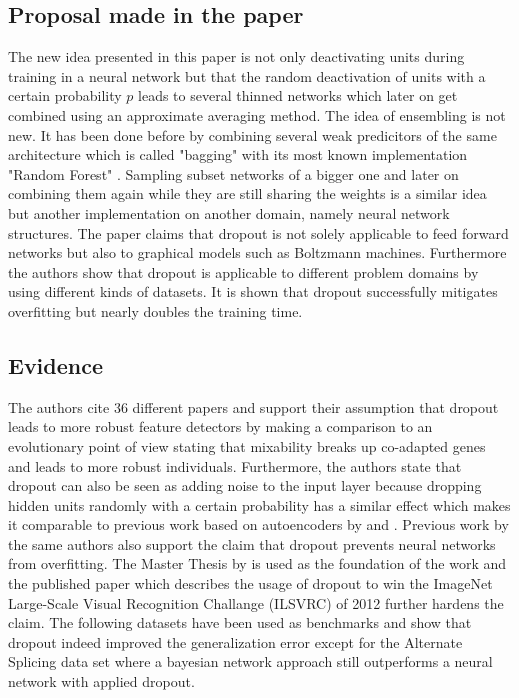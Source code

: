 \documentclass[a4paper]{article}
\begin{document}
\subsection{Proposal made in the paper}

The new idea presented in this paper is not only deactivating units during training in a neural network but that the random deactivation of units with a certain probability $p$ leads to several thinned networks which later on get combined using an approximate averaging method. The idea of ensembling is not new. It has been done before by combining several weak predicitors of the same architecture which is called "bagging" \cite{breiman1996bagging} with its most known implementation "Random Forest" \cite{breiman2001random}. Sampling subset networks of a bigger one and later on combining them again while they are still sharing the weights is a similar idea but another implementation on another domain, namely neural network structures. The paper claims that dropout is not solely applicable to feed forward networks but also to graphical models such as Boltzmann machines. Furthermore the authors show that dropout is applicable to different problem domains by using different kinds of datasets. It is shown that dropout successfully mitigates overfitting but nearly doubles the training time.


\subsection{Evidence}

The authors cite 36 different papers and support their assumption that dropout leads to more robust feature detectors by making a comparison to an evolutionary point of view \cite{livnat2010sex} stating that mixability breaks up co-adapted genes and leads to more robust individuals. Furthermore, the authors state that dropout can also be seen as adding noise to the input layer because dropping hidden units randomly with a certain probability has a similar effect which makes it comparable to previous work based on autoencoders by \cite{vincent2008extracting} and \cite{vincent2010stacked}. Previous work by the same authors also support the claim that dropout prevents neural networks from overfitting. The Master Thesis by \cite{Srivastava_improvingneural} is used as the foundation of the work and the published paper which describes the usage of dropout to win the ImageNet Large-Scale Visual Recognition Challange (ILSVRC) of 2012 \cite{NIPS2012_4824} further hardens the claim. The following datasets have been used as benchmarks and show that dropout indeed improved the generalization error except for the Alternate Splicing data set where a bayesian network approach still outperforms a neural network with applied dropout.
\end{document}
